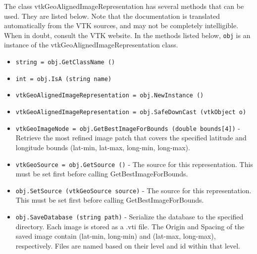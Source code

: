 The class vtkGeoAlignedImageRepresentation has several methods that can be used.
  They are listed below.
Note that the documentation is translated automatically from the VTK sources,
and may not be completely intelligible.  When in doubt, consult the VTK website.
In the methods listed below, \verb|obj| is an instance of the vtkGeoAlignedImageRepresentation class.
\begin{itemize}
\item  \verb|string = obj.GetClassName ()|

\item  \verb|int = obj.IsA (string name)|

\item  \verb|vtkGeoAlignedImageRepresentation = obj.NewInstance ()|

\item  \verb|vtkGeoAlignedImageRepresentation = obj.SafeDownCast (vtkObject o)|

\item  \verb|vtkGeoImageNode = obj.GetBestImageForBounds (double bounds[4])| -  Retrieve the most refined image patch that covers the specified
 latitude and longitude bounds (lat-min, lat-max, long-min, long-max).

\item  \verb|vtkGeoSource = obj.GetSource ()| -  The source for this representation. This must be set first before
 calling GetBestImageForBounds.

\item  \verb|obj.SetSource (vtkGeoSource source)| -  The source for this representation. This must be set first before
 calling GetBestImageForBounds.

\item  \verb|obj.SaveDatabase (string path)| -  Serialize the database to the specified directory.
 Each image is stored as a .vti file.
 The Origin and Spacing of the saved image contain (lat-min, long-min)
 and (lat-max, long-max), respectively.
 Files are named based on their level and id within that level.

\end{itemize}
